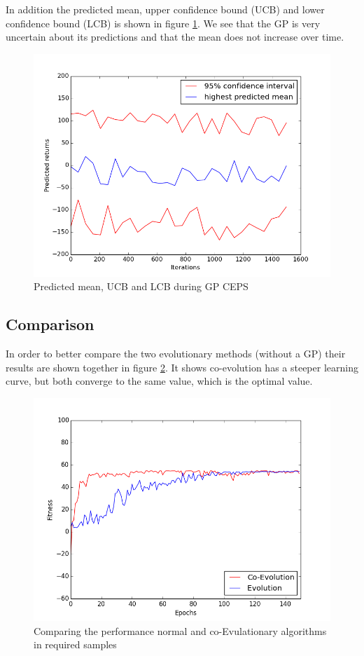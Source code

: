 In addition the predicted mean, upper confidence bound (UCB) and lower confidence bound (LCB) is shown in figure \ref{pred_img}. We see that the GP is very uncertain about its predictions and that the mean does not increase over time.

\begin{figure}[!htb]
  \centering
  \includegraphics[scale=0.5]{images/GPCEPS_pred.png}
  \caption{Predicted mean, UCB and LCB during GP CEPS}\label{pred_img}
\end{figure}


\subsection{Comparison}\label{comparisonSection}
In order to better compare the two evolutionary methods (without a GP) their results are shown together in figure \ref{compare_img}. It shows co-evolution has a steeper learning curve, but both converge to the same value, which is the optimal value.

\begin{figure}[!htb]
  \centering
  \includegraphics[scale=0.5]{images/together.png}
  \caption{Comparing the performance normal and co-Evulationary algorithms in required samples}\label{compare_img}
\end{figure}


